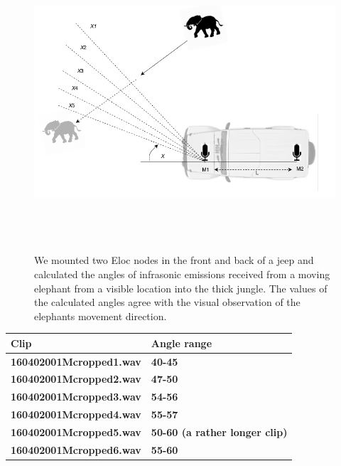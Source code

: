\documentclass[12pt]{article}
\numberwithin{figure}{section}
\numberwithin{table}{section}
\begin{document}
\begin{figure}[H]
\centering
\includegraphics[width=14cm,height=11cm,keepaspectratio]{yalascene.png}
\caption[A recording scenario at Yala]{We mounted two Eloc nodes in the front and back
of a jeep and calculated the angles of infrasonic emissions received
from a moving elephant from a visible location into
the thick jungle. The values of the calculated angles agree
with the visual observation of the elephants movement direction.}
\label{yalascene}
\end{figure}


\begin{table}[H]
\centering
\begin{tabular}{|m{}|m{}|} 
\hline
\bf {Clip} &  {\bf{Angle range}}\\
\hline
\hline
\bf {160402001Mcropped1.wav } &  {\bf{ 40-45  }} \\
\hline
\bf {160402001Mcropped2.wav } &  {\bf{47-50}} \\
\hline
\bf {160402001Mcropped3.wav} &  {\bf{  54-56}} \\
\hline
\bf {160402001Mcropped4.wav} &  {\bf{ 55-57 }} \\
\hline
\bf {160402001Mcropped5.wav } &  {\bf{  50-60   (a rather longer clip) }} \\
\hline
\bf {160402001Mcropped6.wav} &  {\bf{ 55-60}} \\
\hline
\end{tabular}
\end{table}
\end{document}
